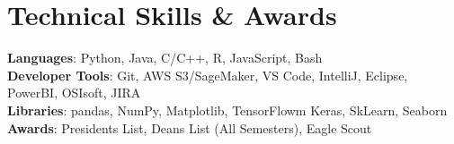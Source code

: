 \documentclass[letterpaper,11pt]{article}
\begin{document}
\section{}
%
\section{Technical Skills \& Awards}
 \begin{itemize}[leftmargin=0.15in, label={}]
    \small{\item{
     \textbf{Languages}{: Python, Java, C/C++, R, JavaScript, Bash} \\
     \textbf{Developer Tools}{: Git, AWS S3/SageMaker, VS Code, IntelliJ, Eclipse, PowerBI, OSIsoft, JIRA} \\
     \textbf{Libraries}{: pandas, NumPy, Matplotlib, TensorFlowm Keras, SkLearn, Seaborn} \\
     \textbf{Awards}{: Presidents List, Deans List (All Semesters), Eagle Scout}
    }}
 \end{itemize}


\end{document}
